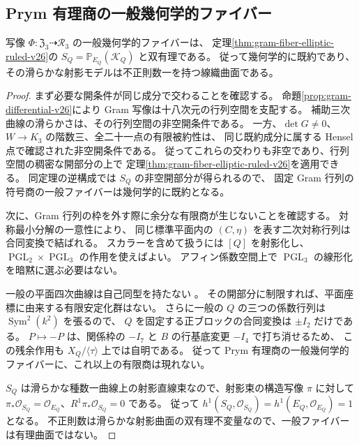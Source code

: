 \subsection{Prym 有理商の一般幾何学的ファイバー}
\label{subsec:prym-descent-v26}

\begin{corollary}[粗ファイバーへの降下]
\label{cor:coarse-prym-fiber-v26}
写像 $\Phi:\mathfrak Z_3\dashrightarrow\mathcal R_3$ の一般幾何学的ファイバーは、
定理\ref{thm:gram-fiber-elliptic-ruled-v26}の
$S_Q=\mathbb P_{E_Q}(\mathcal K_Q)$ と双有理である。
従って幾何学的に既約であり、その滑らかな射影モデルは不正則数一を持つ線織曲面である。
\end{corollary}

\begin{proof}
まず必要な開条件が同じ成分で交わることを確認する。
命題\ref{prop:gram-differential-v26}により Gram 写像は十八次元の行列空間を支配する。
補助三次曲線の滑らかさは、その行列空間の非空開条件である。
一方、$\det G\ne0$、$W\to K_3$ の階数三、全二十一点の有限被約性は、
同じ既約成分に属する Hensel 点で確認された非空開条件である。
従ってこれらの交わりも非空であり、行列空間の稠密な開部分の上で
定理\ref{thm:gram-fiber-elliptic-ruled-v26}を適用できる。
同定理の逆構成では $S_Q$ の非空開部分が得られるので、
固定 Gram 行列の符号商の一般ファイバーは幾何学的に既約となる。

次に、Gram 行列の枠を外す際に余分な有限商が生じないことを確認する。
対称最小分解の一意性\cite[\S2.3]{BeauvilleDeterminantal}により、
同じ標準平面内の $(C,\eta)$ を表す二次対称行列は合同変換で結ばれる。
スカラーを含めて扱うには $[Q]$ を射影化し、
$\operatorname{PGL}_2\times\operatorname{PGL}_3$ の作用を使えばよい。
アフィン係数空間上で $\operatorname{PGL}_3$ の線形化を暗黙に選ぶ必要はない。

一般の平面四次曲線は自己同型を持たない
\cite[\S3.1, Theorem 3.1 and Figure 1]{QuarticAutomorphisms}。
その開部分に制限すれば、平面座標に由来する有限安定化群はない。
さらに一般の $Q$ の三つの係数行列は $\operatorname{Sym}^2(k^2)$ を張るので、
$Q$ を固定する正ブロックの合同変換は $\pm I_2$ だけである。
$P\mapsto-P$ は、関係枠の $-I_7$ と $B$ の行基底変更 $-I_4$ で打ち消せるため、
この残余作用も $X_Q/\langle\tau\rangle$ 上では自明である。
従って Prym 有理商の一般幾何学的ファイバーに、これ以上の有限商は現れない。

$S_Q$ は滑らかな種数一曲線上の射影直線束なので、射影束の構造写像 $\pi$ に対して
$\pi_*\mathcal O_{S_Q}=\mathcal O_{E_Q}$、$R^1\pi_*\mathcal O_{S_Q}=0$ である。
従って $h^1(S_Q,\mathcal O_{S_Q})=h^1(E_Q,\mathcal O_{E_Q})=1$ となる。
不正則数は滑らかな射影曲面の双有理不変量なので、一般ファイバーは有理曲面ではない。
\end{proof}

